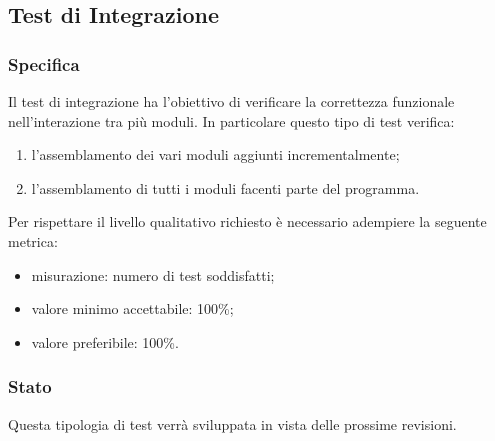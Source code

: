 \subsection{Test di Integrazione}

	\subsubsection{Specifica}
		Il test di integrazione ha l'obiettivo di verificare la correttezza funzionale nell’interazione tra più moduli. In particolare questo tipo di test verifica:
		\begin{enumerate}
			\item{l'assemblamento dei vari moduli aggiunti incrementalmente;}
			\item{l'assemblamento di tutti i moduli facenti parte del programma.}
		\end{enumerate}
		Per rispettare il livello qualitativo richiesto è necessario adempiere la seguente metrica:
		\begin{itemize}
			\item{misurazione: numero di test soddisfatti;}
			\item{valore minimo accettabile: 100\%;}
			\item{valore preferibile: 100\%.}
		\end{itemize}
	
	
	\subsubsection{Stato}
		Questa tipologia di test verrà sviluppata in vista delle prossime revisioni.